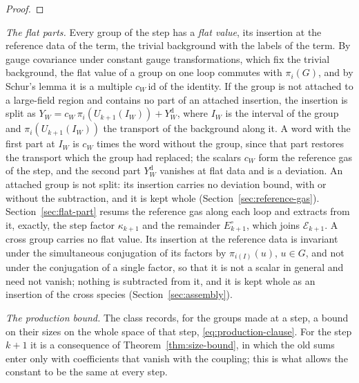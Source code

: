 \documentclass[11pt]{preprint}
\numberwithin{equation}{section}
\theoremstyle{definition}
\theoremstyle{remark}
\theoremstyle{plain}
\begin{document}
\begin{proof}
\end{proof}

\emph{The flat parts.} Every group of the step has a \emph{flat value}, its insertion at the reference data of the term, the trivial background with the labels of the term. By gauge covariance under constant gauge transformations, which fix the trivial background, the flat value of a group on one loop commutes with $\pi_i(G)$, and by Schur's lemma it is a multiple $c_W\,\mathrm{id}$ of the identity. If the group is not attached to a large-field region and contains no part of an attached insertion, the insertion is split as $Y_W = c_W\,\pi_i(U_{k+1}(I_W)) + Y^{\mathrm d}_W$, where $I_W$ is the interval of the group and $\pi_i(U_{k+1}(I_W))$ the transport of the background along it. A word with the first part at $I_W$ is $c_W$ times the word without the group, since that part restores the transport which the group had replaced; the scalars $c_W$ form the reference gas of the step, and the second part $Y^{\mathrm d}_W$ vanishes at flat data and is a deviation. An attached group is not split: its insertion carries no deviation bound, with or without the subtraction, and it is kept whole (Section~\ref{sec:reference-gas}). Section~\ref{sec:flat-part} resums the reference gas along each loop and extracts from it, exactly, the step factor $\kappa_{k+1}$ and the remainder $E^{\circ}_{k+1}$, which joins $\mathcal E_{k+1}$. A cross group carries no flat value. Its insertion at the reference data is invariant under the simultaneous conjugation of its factors by $\pi_{i(I)}(u)$, $u \in G$, and not under the conjugation of a single factor, so that it is not a scalar in general and need not vanish; nothing is subtracted from it, and it is kept whole as an insertion of the cross species (Section~\ref{sec:assembly}).

\emph{The production bound.} The class records, for the groups made at a step, a bound on their sizes on the whole space of that step, \eqref{eq:production-clause}. For the step $k + 1$ it is a consequence of Theorem~\ref{thm:size-bound}, in which the old sums enter only with coefficients that vanish with the coupling; this is what allows the constant to be the same at every step.
\end{document}
